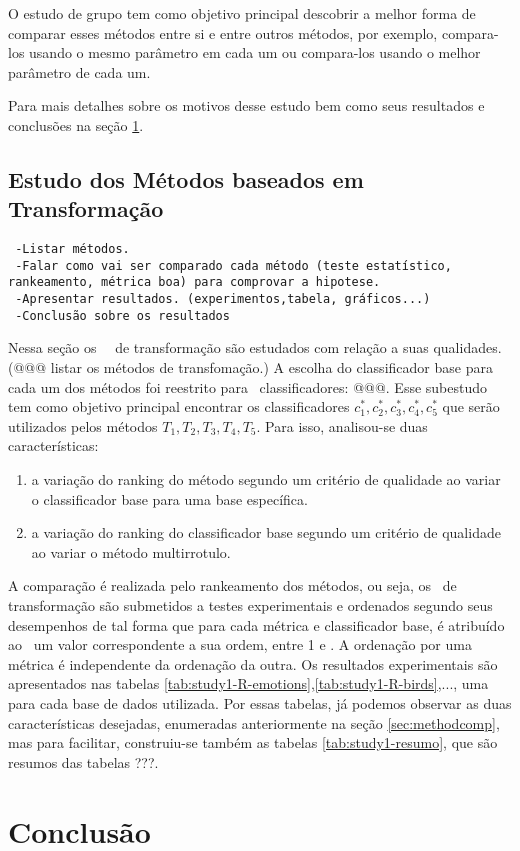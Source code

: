 O estudo de grupo tem como objetivo principal descobrir a melhor forma de comparar esses métodos entre si e
entre outros métodos, por exemplo, compara-los usando o mesmo parâmetro em cada um ou compara-los usando o melhor parâmetro
de cada um.


  Para mais detalhes sobre os motivos desse estudo bem como seus resultados e conclusões na seção \ref{sec:study1}.
  

\section{Estudo dos Métodos baseados em Transformação}
\label{sec:study1}
\begin{verbatim}
 -Listar métodos.
 -Falar como vai ser comparado cada método (teste estatístico, rankeamento, métrica boa) para comprovar a hipotese.
 -Apresentar resultados. (experimentos,tabela, gráficos...)
 -Conclusão sobre os resultados
\end{verbatim}

Nessa seção os \NmlT~\MMLs~de transformação são estudados com relação a suas qualidades. (@@@ listar os métodos de transfomação.)
A escolha do classificador base para cada um dos métodos foi reestrito para \Ncb~classificadores: @@@.
Esse subestudo tem como objetivo principal encontrar os classificadores $c_1^*,c_2^*,c_3^*,c_4^*,c_5^*$ que serão utilizados pelos
métodos $T_1,T_2,T_3,T_4,T_5$.
Para isso, analisou-se duas características:
  \begin{enumerate}
  
  \item a variação do ranking do método segundo um critério de qualidade ao variar o classificador base
  para uma base específica.
  \item a variação do ranking do classificador base segundo um critério de qualidade ao variar o método multirrotulo.
  \end{enumerate}

A comparação é realizada pelo rankeamento dos métodos, ou seja, os \MMLs~de transformação são submetidos a testes experimentais
e ordenados segundo seus desempenhos de tal forma que para cada métrica e classificador base,
é atribuído ao \MML~um valor correspondente a sua ordem, entre 1 e \NmlT. A ordenação por uma métrica
é independente da ordenação da outra. 
Os resultados experimentais são apresentados nas tabelas \ref{tab:study1-R-emotions},\ref{tab:study1-R-birds},..., uma para cada base de dados utilizada.
Por essas tabelas, já podemos observar as duas características desejadas, enumeradas anteriormente na seção \ref{sec:methodcomp},
mas para facilitar, construiu-se também as tabelas \ref{tab:study1-resumo}, que são resumos das tabelas ???.






\chapter{Conclusão}
